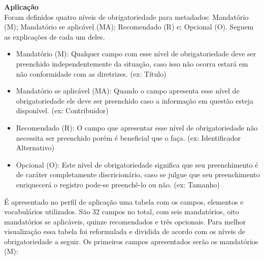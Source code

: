 \documentclass[12pt,hidelinks]{article}
\begin{document}
	\textbf{Aplicação}\\
	
	Foram definidos quatro níveis de obrigatoriedade para metadados: Mandatório (M); Mandatório se aplicável (MA); Recomendado (R) e; Opcional (O). Seguem as explicações de cada um deles.
	
	\begin{itemize}
	    \item Mandatório (M): Qualquer campo com esse nível de obrigatoriedade deve ser preenchido independentemente da situação, caso isso não ocorra estará em não conformidade com as diretrizes. (ex: Título)
        \item Mandatório se aplicável (MA): Quando o campo apresenta esse nível de obrigatoriedade ele deve ser preenchido caso a informação em questão esteja disponível. (ex: Contribuidor)
        \item Recomendado (R): O campo que apresentar esse nível de obrigatoriedade não necessita ser preenchido porém é beneficial que o faça. (ex: Identificador Alternativo)
        \item Opcional (O): Este nível de obrigatoriedade significa que seu preenchimento é de caráter completamente discricionário, caso se julgue que seu preenchimento enriquecerá o registro pode-se preenchê-lo ou não. (ex: Tamanho)
	\end{itemize}
	
	É apresentado no perfil de aplicação uma tabela  com os campos, elementos e vocabulários utilizados. São 32 campos no total, com seis mandatórios, oito mandatórios se aplicáveis, quinze recomendados e três opcionais. Para melhor visualização essa tabela foi reformulada e dividida de acordo com os níveis de obrigatoriedade a seguir. Os primeiros campos apresentados serão os mandatórios (M):
	
\end{document}
